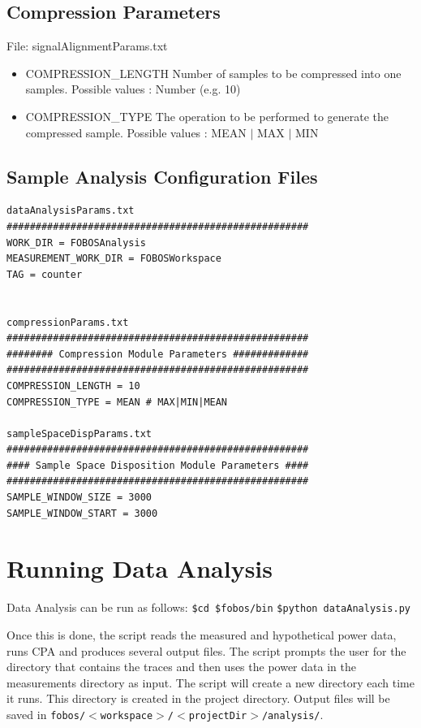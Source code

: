 \subsection{Compression Parameters}
File: signalAlignmentParams.txt
\begin{itemize}
 \item COMPRESSION\_LENGTH \newline
 Number of samples to be compressed into one samples. \newline 
 Possible values : Number (e.g. 10)
 \item COMPRESSION\_TYPE \newline 
 The operation to be performed to generate the compressed sample.\newline
 Possible values : MEAN $|$ MAX $|$ MIN
\end{itemize}

\subsection{Sample Analysis Configuration Files}

\begin{verbatim}
dataAnalysisParams.txt 
####################################################
WORK_DIR = FOBOSAnalysis 
MEASUREMENT_WORK_DIR = FOBOSWorkspace 
TAG = counter


compressionParams.txt 
#################################################### 
######## Compression Module Parameters ############# 
#################################################### 
COMPRESSION_LENGTH = 10 
COMPRESSION_TYPE = MEAN # MAX|MIN|MEAN 

sampleSpaceDispParams.txt 
#################################################### 
#### Sample Space Disposition Module Parameters #### 
#################################################### 
SAMPLE_WINDOW_SIZE = 3000 
SAMPLE_WINDOW_START = 3000

\end{verbatim}


\section{Running Data Analysis}

Data Analysis can be run as follows: \newline
\texttt{\$cd \$fobos/bin} \newline
\texttt{\$python dataAnalysis.py} \newline

Once this is done, the script reads the measured and hypothetical power data, runs CPA and
produces several output files. The script prompts the user for the directory that contains the traces
and then uses the power data in the measurements directory as input.  The script
will create a new directory each time it runs. This directory is created in the project directory. Output files will be saved in \texttt{fobos/$<$workspace$>$/$<$projectDir$>$/analysis/}.

